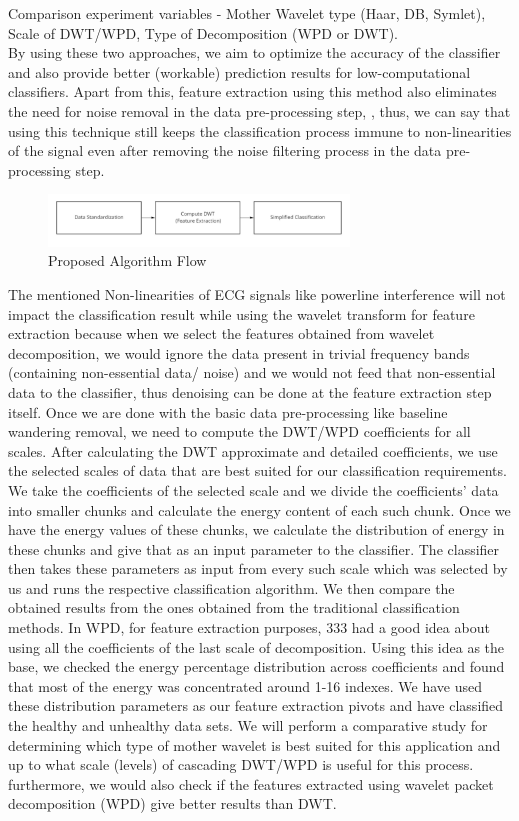 \documentclass[10pt,twocolumn,letterpaper]{article}
\begin{document}
\cite{Alpher01,Alpher02,Alpher03,Alpher04, Alpher05}
Comparison experiment variables - Mother Wavelet type (Haar, DB, Symlet), Scale of DWT/WPD, Type of Decomposition (WPD or DWT).\\
By using these two approaches, we aim to optimize the accuracy of the classifier and also provide better (workable) prediction results for low-computational classifiers. Apart from this, feature extraction using this method also eliminates the need for noise removal in the data pre-processing step, , thus, we can say that using this technique still keeps the classification process immune to non-linearities of the signal even after removing the noise filtering process in the data pre-processing step.
\begin{figure}[htbp]
\includegraphics[width=8cm]{proposed.png}
\caption{Proposed Algorithm Flow}
\label{Proposed Algorithm}
\end{figure}

The mentioned Non-linearities of ECG signals like powerline interference will not impact the classification result while using the wavelet transform for feature extraction because when we select the features obtained from wavelet decomposition, we would ignore the data present in trivial frequency bands (containing non-essential data/ noise) and we would not feed that non-essential data to the classifier, thus denoising can be done at the feature extraction step itself. 
Once we are done with the basic data pre-processing like baseline wandering removal, we need to compute the DWT/WPD coefficients for all scales. After calculating the DWT approximate and detailed coefficients, we use the selected scales of data that are best suited for our classification requirements. We take the coefficients of the selected scale and we divide the coefficients’ data into smaller chunks and calculate the energy content of each such chunk. Once we have the energy values of these chunks, we calculate the distribution of energy in these chunks and give that as an input parameter to the classifier. The classifier then takes these parameters as input from every such scale which was selected by us and runs the respective classification algorithm. We then compare the obtained results from the ones obtained from the traditional classification methods.
In WPD, for feature extraction purposes, 333 had a good idea about using all the coefficients of the last scale of decomposition. Using this idea as the base, we checked the energy percentage distribution across coefficients and found that most of the energy was concentrated around 1-16 indexes. We have used these distribution parameters as our feature extraction pivots and have classified the healthy and unhealthy data sets.   
We will perform a comparative study for determining which type of mother wavelet is best suited for this application and up to what scale (levels) of cascading DWT/WPD is useful for this process. furthermore, we would also check if the features extracted using wavelet packet decomposition (WPD) give better results than DWT.
\end{document}
